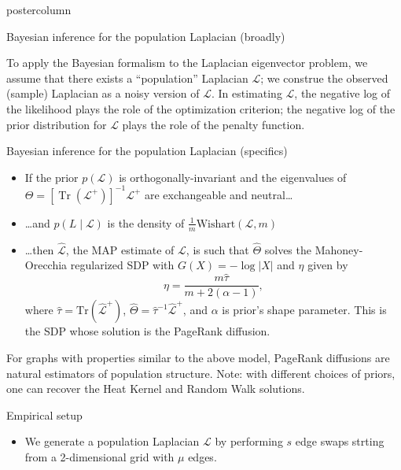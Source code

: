 \documentclass[final,hyperref={pdfpagelabels=false}]{beamer}
\DeclareMathOperator{\Tr}{Tr}
\begin{document}
\begin{frame}
\begin{columns}
\begin{column}{.49\textwidth}
\begin{beamercolorbox}[center,wd=\textwidth]{postercolumn}
\begin{minipage}[T]{.95\textwidth}
{\begin{block}{Bayesian inference for the population Laplacian (broadly)}
  \vspace{1em}

  To apply the Bayesian formalism to the Laplacian eigenvector problem, we
assume that there exists a ``population'' Laplacian $\mathcal{L}$; we construe
the observed (sample) Laplacian as a noisy version of $\mathcal{L}$.  In
estimating $\mathcal{L}$, the negative log of the likelihood plays the role of
the optimization criterion; the negative log of the prior distribution for
$\mathcal{L}$ plays the role of the penalty function.
  
            \end{block}

            \vfill
            \begin{block}{Bayesian inference for the population Laplacian (specifics)}
	    \begin{itemize}
	      \item If the prior $p(\mathcal{L})$ is orthogonally-invariant and the
	        eigenvalues of $\Theta = [\Tr(\mathcal{L}^+)]^{-1} \mathcal{L}^{+}$
		are exchangeable and neutral\ldots

	      \item \ldots and $p(L\mid \mathcal{L})$ is the density of
	      $\frac{1}{m} \mathrm{Wishart}(\mathcal{L}, m)$

	      \item \ldots then $\mathcal{\hat L}$, the MAP estimate of
	      $\mathcal{L}$, is such that $\hat \Theta$ solves the
	      Mahoney-Orecchia regularized SDP with $G(X) = -\log |X|$ and
	      $\eta$ given by
	      \[
		\eta = \frac{m \hat \tau}{m + 2 (\alpha - 1)},
	      \]
	      where $\hat \tau = \mathrm{Tr}(\mathcal{\hat L}^+)$,
	      $\hat \Theta = \hat \tau^{-1} \mathcal{\hat L}^+$,
	      and $\alpha$ is prior's shape parameter.  This is the SDP
	      whose solution is the PageRank diffusion.
	    \end{itemize}
	    \vspace{1em}
	    For graphs with properties similar to the above model, PageRank
	    diffusions are natural estimators of population structure.
	    Note: with different choices of priors, one can recover the Heat
	    Kernel and Random Walk solutions.
            \end{block}

            \vfill

            \begin{block}{Empirical setup}
	    \begin{itemize}
	    \item We generate a population Laplacian $\mathcal{L}$ by
	    performing $s$ edge swaps strting from a 2-dimensional grid with
	    $\mu$ edges.
	    \end{itemize}


\end{block}}
\end{minipage}
\end{beamercolorbox}
\end{column}
\end{columns}
\end{frame}
\end{document}
